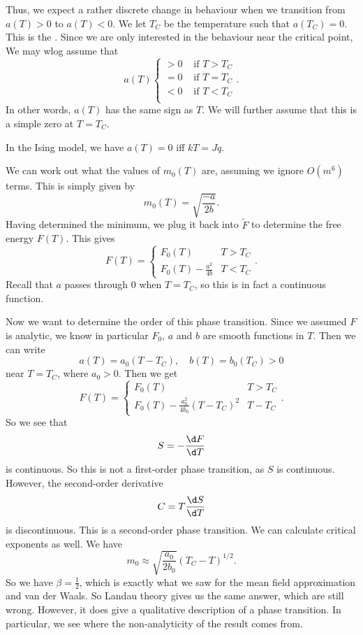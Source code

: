 \documentclass[a4paper]{article}
\begin{document}
Thus, we expect a rather discrete change in behaviour when we transition from $a(T) > 0$ to $a(T) < 0$. We let $T_C$ be the temperature such that $a(T_C) = 0$. This is the . Since we are only interested in the behaviour near the critical point, We may wlog assume that
\[
  a(T)
  \begin{cases}
    > 0& \text{ if }T > T_C\\
    = 0& \text{ if }T = T_C\\
    < 0& \text{ if }T < T_C\\
  \end{cases}.
\]
In other words, $a(T)$ has the same sign as $T$. We will further assume that this is a simple zero at $T = T_C$.

\begin{eg}
  In the Ising model, we have $a(T) = 0$ iff $kT = Jq$.
\end{eg}
We can work out what the values of $m_0(T)$ are, assuming we ignore $O(m^6)$ terms. This is simply given by
\[
  m_0(T) = \sqrt{\frac{-a}{2b}}.
\]
Having determined the minimum, we plug it back into $\tilde{F}$ to determine the free energy $F(T)$. This gives
\[
  F(T) =
  \begin{cases}
    F_0(T) & T > T_C\\
    F_0(T) - \frac{a^2}{4b} & T < T_C
  \end{cases}.
\]
Recall that $a$ passes through $0$ when $T = T_C$, so this is in fact a continuous function.

Now we want to determine the order of this phase transition. Since we assumed $F$ is analytic, we know in particular $F_0$, $a$ and $b$ are smooth functions in $T$. Then we can write
\[
  a(T) = a_0(T - T_C),\quad b(T) = b_0(T_C) > 0
\]
near $T = T_C$, where $a_0 > 0$. Then we get
\[
  F(T) =
  \begin{cases}
    F_0(T) & T > T_C\\
    F_0(T) - \frac{a_0^2}{4b_0}(T - T_C)^2 & T - T_C
  \end{cases}.
\]
So we see that
\[
  S = - \frac{\d F}{\d T}
\]
is continuous. So this is not a first-order phase transition, as $S$ is continuous. However, the second-order derivative
\[
  C = T \frac{\d S}{\d T}
\]
is discontinuous. This is a second-order phase transition. We can calculate critical exponents as well. We have
\[
  m_0 \approx \sqrt{\frac{a_0}{2 b_0}} (T_C - T)^{1/2}.
\]
So we have $\beta = \frac{1}{2}$, which is exactly what we saw for the mean field approximation and van der Waals. So Landau theory gives us the same answer, which are still wrong. However, it does give a qualitative description of a phase transition. In particular, we see where the non-analyticity of the result comes from.
\end{document}
